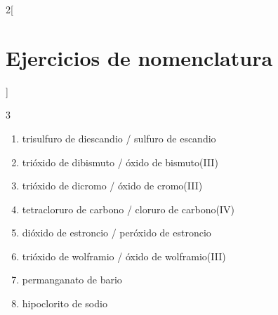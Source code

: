\documentclass[10pt]{article}
\begin{document}
\begin{multicols*}{2}[
  \section{Ejercicios de nomenclatura}
  ]
\begin{exercise}[
    tags    = {inorgánica,nomenclatura,múltiple,2B},
    topics  = {química inorgánica,formulación,nomenclatura},
    source  = {Química 2B SAN 2016, p372, e11},
  ]
  \begin{enumerate}\begin{multicols}{3}
    \item {}
    \item {}
    \item {}
    \item {}
    \item {}
    \item {}
    \item {}
    \item {}
  \end{multicols}\end{enumerate}
\end{exercise}

\begin{solution}
  \begin{enumerate}
    \item trisulfuro de diescandio / sulfuro de escandio
    \item trióxido de dibismuto / óxido de bismuto(III)
    \item trióxido de dicromo / óxido de cromo(III)
    \item tetracloruro de carbono / cloruro de carbono(IV)
    \item dióxido de estroncio / peróxido de estroncio
    \item trióxido de wolframio / óxido de wolframio(III)
    \item permanganato de bario
    \item hipoclorito de sodio
  \end{enumerate}
\end{solution}

\end{multicols*}
\end{document}
